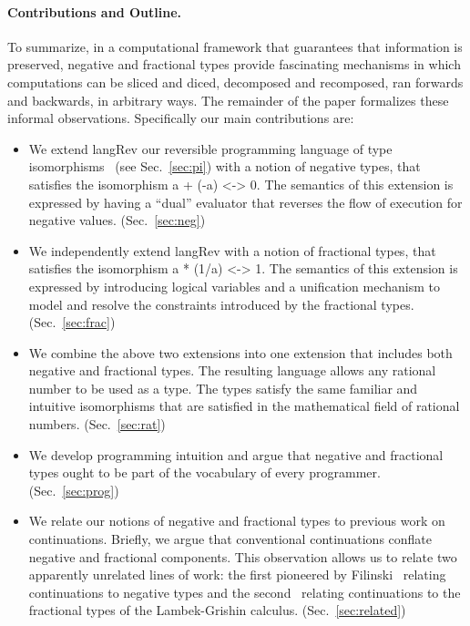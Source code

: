 \documentclass[preprint]{sigplanconf}
\begin{document}
\paragraph*{Contributions and Outline.} 
To summarize, in a computational framework that guarantees that information
is preserved, negative and fractional types provide fascinating mechanisms in
which computations can be sliced and diced, decomposed and recomposed, ran
forwards and backwards, in arbitrary ways. The remainder of the paper
formalizes these informal observations. Specifically our main contributions
are:
\begin{itemize}
\item We extend {{langRev}} our reversible programming language of type
  isomorphisms~\cite{rc2011,infeffects} (see Sec.~\ref{sec:pi}) with a notion
  of negative types, that satisfies the isomorphism {{a + (-a) <-> 0}}. The
  semantics of this extension is expressed by having a ``dual'' evaluator
  that reverses the flow of execution for negative
  values. (Sec.~\ref{sec:neg})
\item We independently extend {{langRev}} with a notion of fractional types,
  that satisfies the isomorphism {{a * (1/a) <-> 1}}. The semantics of this
  extension is expressed by introducing logical variables and a unification
  mechanism to model and resolve the constraints introduced by the fractional
  types. (Sec.~\ref{sec:frac})
\item We combine the above two extensions into one extension that includes
  both negative and fractional types. The resulting language allows any
  rational number to be used as a type. The types satisfy the same familiar
  and intuitive isomorphisms that are satisfied in the mathematical field of
  rational numbers. (Sec.~\ref{sec:rat})
\item We develop programming intuition and argue that negative and fractional
  types ought to be part of the vocabulary of every
  programmer. (Sec.~\ref{sec:prog})
\item We relate our notions of negative and fractional types to previous work
  on continuations. Briefly, we argue that conventional continuations
  conflate negative and fractional components. This observation allows us to
  relate two apparently unrelated lines of work: the first pioneered by
  Filinski~\cite{Filinski:1989:DCI:648332.755574} relating continuations to
  negative types and the second~\cite{Bernardi:2010:CSL:1749618.1749689}
  relating continuations to the fractional types of the Lambek-Grishin
  calculus. (Sec.~\ref{sec:related})
\end{itemize}
\end{document}
